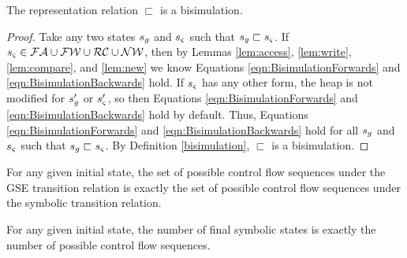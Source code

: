 \begin{theorem}
\label{th:bisim}
The representation relation $\sqsubset$ is a bisimulation.
\end{theorem}

\begin{proof}
Take any two states $s_{g}$ and $s_{\varsigma}$ such that $s_{g} \sqsubset s_{\varsigma}$. If $s_{\varsigma} \in \mathcal{FA} \cup \mathcal{FW} \cup \mathcal{RC} \cup \mathcal{NW}$, then by Lemmas \ref{lem:access}, \ref{lem:write}, \ref{lem:compare}, and \ref{lem:new} we know Equations \ref{eqn:BisimulationForwards} and \ref{eqn:BisimulationBackwards} hold. If $s_{\varsigma}$ has any other form, the heap is not modified for $s_{g}^\prime$ or $s_{\varsigma}^\prime$, so then Equations \ref{eqn:BisimulationForwards} and \ref{eqn:BisimulationBackwards} hold by default. Thus, Equations \ref{eqn:BisimulationForwards} and \ref{eqn:BisimulationBackwards} hold for all  $s_{g}$ and $s_{\varsigma}$ such that $s_{g} \sqsubset s_{\varsigma}$. By Definition \ref{bisimulation}, $\sqsubset$ is a bisimulation.

\end{proof}

\begin{corollary}
For any given initial state, the set of possible control flow sequences under the GSE transition relation is exactly the set of possible control flow sequences under the symbolic transition relation.
\end{corollary}

\begin{corollary}
For any given initial state, the number of final symbolic states is exactly the number of possible control flow sequences.
\end{corollary}

